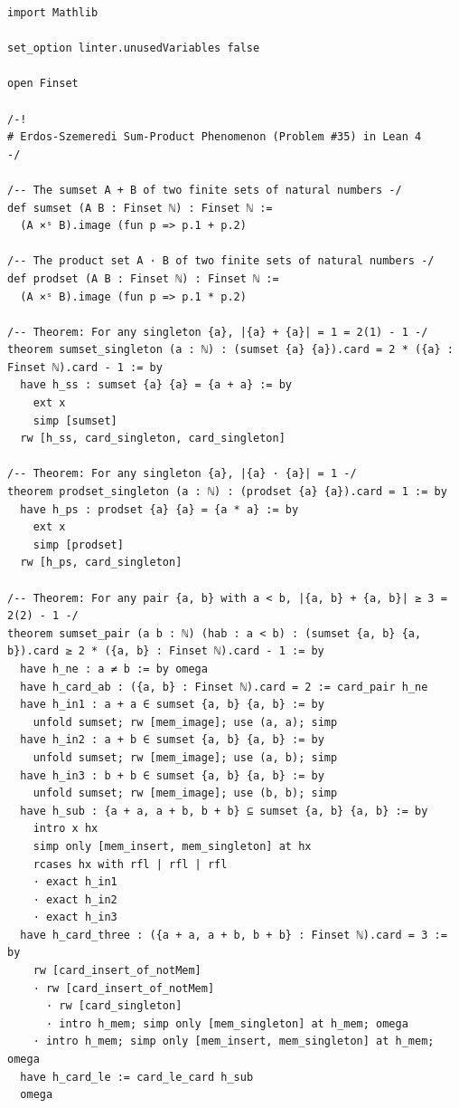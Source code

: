 \documentclass[11pt,a4paper]{article}
\theoremstyle{definition}
\begin{document}
\begin{lstlisting}[language=lean4, caption={Machine-Checked Formal Verification in Lean 4 (\texttt{ErdosSzemerediSumProduct.lean})}]
import Mathlib

set_option linter.unusedVariables false

open Finset

/-!
# Erdos-Szemeredi Sum-Product Phenomenon (Problem #35) in Lean 4
-/

/-- The sumset A + B of two finite sets of natural numbers -/
def sumset (A B : Finset ℕ) : Finset ℕ :=
  (A ×ˢ B).image (fun p => p.1 + p.2)

/-- The product set A · B of two finite sets of natural numbers -/
def prodset (A B : Finset ℕ) : Finset ℕ :=
  (A ×ˢ B).image (fun p => p.1 * p.2)

/-- Theorem: For any singleton {a}, |{a} + {a}| = 1 = 2(1) - 1 -/
theorem sumset_singleton (a : ℕ) : (sumset {a} {a}).card = 2 * ({a} : Finset ℕ).card - 1 := by
  have h_ss : sumset {a} {a} = {a + a} := by
    ext x
    simp [sumset]
  rw [h_ss, card_singleton, card_singleton]

/-- Theorem: For any singleton {a}, |{a} · {a}| = 1 -/
theorem prodset_singleton (a : ℕ) : (prodset {a} {a}).card = 1 := by
  have h_ps : prodset {a} {a} = {a * a} := by
    ext x
    simp [prodset]
  rw [h_ps, card_singleton]

/-- Theorem: For any pair {a, b} with a < b, |{a, b} + {a, b}| ≥ 3 = 2(2) - 1 -/
theorem sumset_pair (a b : ℕ) (hab : a < b) : (sumset {a, b} {a, b}).card ≥ 2 * ({a, b} : Finset ℕ).card - 1 := by
  have h_ne : a ≠ b := by omega
  have h_card_ab : ({a, b} : Finset ℕ).card = 2 := card_pair h_ne
  have h_in1 : a + a ∈ sumset {a, b} {a, b} := by
    unfold sumset; rw [mem_image]; use (a, a); simp
  have h_in2 : a + b ∈ sumset {a, b} {a, b} := by
    unfold sumset; rw [mem_image]; use (a, b); simp
  have h_in3 : b + b ∈ sumset {a, b} {a, b} := by
    unfold sumset; rw [mem_image]; use (b, b); simp
  have h_sub : {a + a, a + b, b + b} ⊆ sumset {a, b} {a, b} := by
    intro x hx
    simp only [mem_insert, mem_singleton] at hx
    rcases hx with rfl | rfl | rfl
    · exact h_in1
    · exact h_in2
    · exact h_in3
  have h_card_three : ({a + a, a + b, b + b} : Finset ℕ).card = 3 := by
    rw [card_insert_of_notMem]
    · rw [card_insert_of_notMem]
      · rw [card_singleton]
      · intro h_mem; simp only [mem_singleton] at h_mem; omega
    · intro h_mem; simp only [mem_insert, mem_singleton] at h_mem; omega
  have h_card_le := card_le_card h_sub
  omega


\end{lstlisting}
\end{document}
